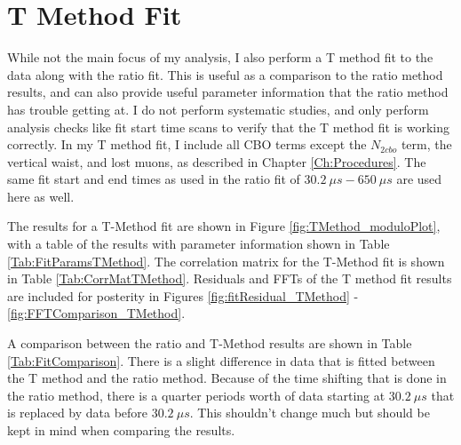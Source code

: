 \graphicspath{ {Figures/TMethod/Main/} {Figures/TMethod/ResidualsFFT/} {Figures/TMethod/Comparison/} {Figures/TMethod/RandomSeeds/} }

\chapter{T Method Fit}
\label{Ch:TMethod}

While not the main focus of my analysis, I also perform a T method fit to the data along with the ratio fit. This is useful as a comparison to the ratio method results, and can also provide useful parameter information that the ratio method has trouble getting at. I do not perform systematic studies, and only perform analysis checks like fit start time scans to verify that the T method fit is working correctly. In my T method fit, I include all CBO terms except the $N_{2cbo}$ term, the vertical waist, and lost muons, as described in Chapter \ref{Ch:Procedures}. The same fit start and end times as used in the ratio fit of $\SI{30.2}{\mu s} - \SI{650}{\mu s}$ are used here as well.

The results for a T-Method fit are shown in Figure \ref{fig:TMethod_moduloPlot}, with a table of the results with parameter information shown in Table \ref{Tab:FitParamsTMethod}. The correlation matrix for the T-Method fit is shown in Table \ref{Tab:CorrMatTMethod}. Residuals and FFTs of the T method fit results are included for posterity in Figures \ref{fig:fitResidual_TMethod} - \ref{fig:FFTComparison_TMethod}.

A comparison between the ratio and T-Method results are shown in Table \ref{Tab:FitComparison}. There is a slight difference in data that is fitted between the T method and the ratio method. Because of the time shifting that is done in the ratio method, there is a quarter \gmtwo periods worth of data starting at $\SI{30.2}{\mu s}$ that is replaced by data before $\SI{30.2}{\mu s}$. This shouldn't change much but should be kept in mind when comparing the results.

